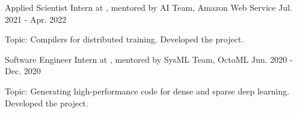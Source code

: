 

\begin{cventries}

\cventry
{Applied Scientist Intern at , mentored by } %
{AI Team, Amazon Web Service} %
{Jul. 2021 - Apr. 2022} %
{} %
{
	\begin{cvitems} %
		\item{Topic: Compilers for distributed training. Developed the  project.}
	\end{cvitems}
}

\cventry
	{Software Engineer Intern at , mentored by } %
	{SysML Team, OctoML} %
	{Jun. 2020 - Dec. 2020} %
	{} %
	{
		\begin{cvitems} %
			\item{Topic: Generating high-performance code for dense and sparse deep learning. Developed the  project.}
		\end{cvitems}
    }

\end{cventries}
